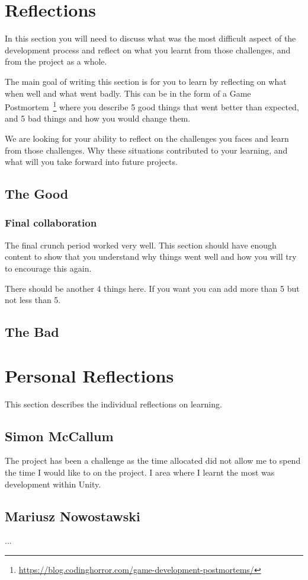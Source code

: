 \section{Reflections}

In this section you will need to discuss what was the most difficult aspect of the development process and reflect on what you learnt from those challenges, and from the project as a whole.

The main goal of writing this section is for you to learn by reflecting on what when well and what went badly.  This can be in the form of a Game Postmortem~\footnote{\url{https://blog.codinghorror.com/game-development-postmortems/}} where you describe 5 good things that went better than expected, and 5 bad things and how you would change them.

We are looking for your ability to reflect on the challenges you faces and learn from those challenges.  Why these situations contributed to your learning, and what will you take forward into future projects.

\subsection {The Good}

\subsubsection{Final collaboration}
The final crunch period worked very well.  This section should have enough content to show that you understand why things went well and how you will try to encourage this again.

There should be another 4 things here. If you want you can add more than 5 but not less than 5.

\subsection {The Bad}


\section{ Personal Reflections}
This section describes the individual reflections on learning.

\subsection{Simon McCallum}
The project has been a challenge as the time allocated did not allow me to spend the time I would like to on the project.  I area where I learnt the most was development within Unity.  

\subsection{Mariusz Nowostawski}
...